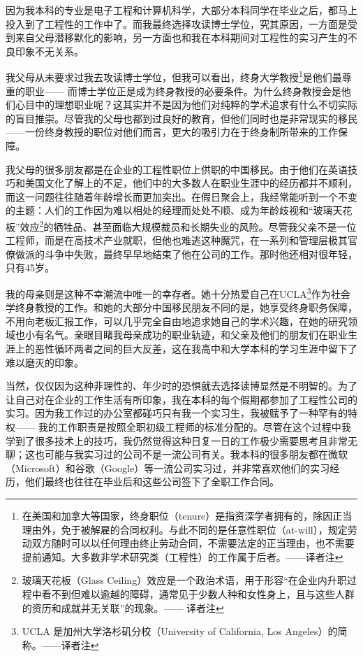 \documentclass[12pt,UTF8,nofonts]{book}
\begin{document}
\mainmatter



因为我本科的专业是电子工程和计算机科学，大部分本科同学在毕业之后，都马上投入到了工程性的工作中了。而我最终选择攻读博士学位，究其原因，一方面是受到来自父母潜移默化的影响，另一方面也和我在本科期间对工程性的实习产生的不良印象不无关系。

我父母从未要求过我去攻读博士学位，但我可以看出，终身大学教授\footnote{在美国和加拿大等国家，终身职位（tenure）是指资深学者拥有的，除因正当理由外，免于被解雇的合同权利。与此不同的是任意性职位（at-will），规定劳动双方随时可以以任何理由终止劳动合同，不需要法定的正当理由，也不需要提前通知。大多数非学术研究类（工程性）的工作属于后者。——译者注}是他们最尊重的职业—— 而博士学位正是成为终身教授的必要条件。为什么终身教授会是他们心目中的理想职业呢？这其实并不是因为他们对纯粹的学术追求有什么不切实际的盲目推崇。尽管我的父母也都到过良好的教育，但他们同时也是非常现实的移民——一份终身教授的职位对他们而言，更大的吸引力在于终身制所带来的工作保障。

我父母的很多朋友都是在企业的工程性职位上供职的中国移民。由于他们在英语技巧和美国文化了解上的不足，他们中的大多数人在职业生涯中的经历都并不顺利，而这一问题往往随着年龄增长而更加突出。在假日聚会上，我经常能听到一个不变的主题：人们的工作因为难以相处的经理而处处不顺、成为年龄歧视和“玻璃天花板”效应\footnote{玻璃天花板（Glass Ceiling）效应是一个政治术语，用于形容“在企业内升职过程中看不到但难以逾越的障碍，通常见于少数人种和女性身上，且与这些人群的资历和成就并无关联”的现象。—— 译者注}的牺牲品、甚至面临大规模裁员和长期失业的风险。尽管我父亲不是一位工程师，而是在高技术产业就职，但他也难逃这种魔咒，在一系列和管理层极其官僚做派的斗争中失败，最终早早地结束了他在公司的工作。那时他还相对很年轻，只有45岁。

我的母亲则是这种不幸潮流中唯一的幸存者。她十分热爱自己在UCLA\footnote{UCLA 是加州大学洛杉矶分校（University of California, Los Angeles）的简称。——译者注}作为社会学终身教授的工作。和她的大部分中国移民朋友不同的是，她享受终身职务保障，不用向老板汇报工作，可以几乎完全自由地追求她自己的学术兴趣，在她的研究领域也小有名气。亲眼目睹我母亲成功的职业轨迹，和父亲及他们的朋友们在职业生涯上的恶性循环两者之间的巨大反差，这在我高中和大学本科的学习生涯中留下了难以磨灭的印象。

当然，仅仅因为这种非理性的、年少时的恐惧就去选择读博显然是不明智的。为了让自己对在企业的工作生活有所印象，我在本科的每个假期都参加了工程性公司的实习。因为我工作过的办公室都碰巧只有我一个实习生，我被赋予了一种罕有的特权—— 我的工作职责是按照全职初级工程师的标准分配的。尽管在这个过程中我学到了很多技术上的技巧，我仍然觉得这种日复一日的工作极少需要思考且非常无聊；这也可能与我实习过的公司不是一流公司有关。我本科的很多朋友都在微软（Microsoft）和谷歌（Google）等一流公司实习过，并非常喜欢他们的实习经历，他们最终也往往在毕业后和这些公司签下了全职工作合同。
\end{document}
